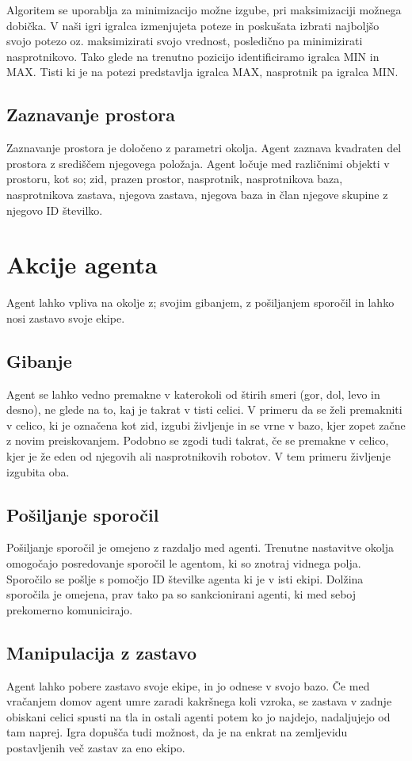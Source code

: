 \documentclass[12pt,a4paper,openany]{book}
\begin{document}
Algoritem se uporablja za minimizacijo možne izgube, pri maksimizaciji možnega dobička. V naši igri igralca izmenjujeta poteze in poskušata izbrati najboljšo svojo potezo oz. maksimizirati svojo vrednost, posledično pa minimizirati nasprotnikovo. Tako glede na trenutno pozicijo identificiramo igralca MIN in MAX. Tisti ki je na potezi predstavlja igralca MAX, nasprotnik pa igralca MIN. 




\subsection{Zaznavanje prostora}
Zaznavanje prostora je določeno z parametri okolja.  Agent zaznava kvadraten del prostora z središčem
njegovega položaja. Agent ločuje med različnimi objekti v prostoru, kot so; zid, prazen prostor, nasprotnik, nasprotnikova baza,
nasprotnikova zastava, njegova zastava, njegova baza in član njegove skupine z njegovo ID številko.


\section{Akcije agenta}
Agent lahko vpliva na okolje z; svojim gibanjem, z pošiljanjem sporočil in lahko nosi zastavo svoje ekipe.

\subsection{Gibanje}
Agent se lahko vedno premakne v katerokoli od štirih smeri (gor, dol, levo in desno), ne glede na to,
kaj je takrat v tisti celici. V primeru da se želi premakniti v celico, ki je označena kot zid, izgubi
življenje in se vrne v bazo, kjer zopet začne z novim preiskovanjem. Podobno se zgodi tudi takrat, če
se premakne v celico, kjer je že eden od njegovih ali nasprotnikovih robotov. V tem primeru življenje izgubita oba.

\subsection{Pošiljanje sporočil}
Pošiljanje sporočil je omejeno z razdaljo med agenti. Trenutne nastavitve okolja omogočajo posredovanje sporočil
 le agentom, ki so znotraj vidnega polja. Sporočilo se pošlje s pomočjo ID številke agenta ki je v isti ekipi.
 Dolžina sporočila je omejena, prav tako pa so sankcionirani agenti, ki med seboj prekomerno komunicirajo.

\subsection{Manipulacija z zastavo}
Agent lahko pobere zastavo svoje ekipe, in jo odnese v svojo bazo. Če med vračanjem domov agent umre zaradi
kakršnega koli vzroka, se zastava v zadnje obiskani celici spusti na tla in ostali agenti potem ko jo najdejo,
nadaljujejo od tam naprej. Igra dopušča tudi možnost, da je na enkrat na zemljevidu postavljenih več zastav za eno ekipo.
\end{document}
